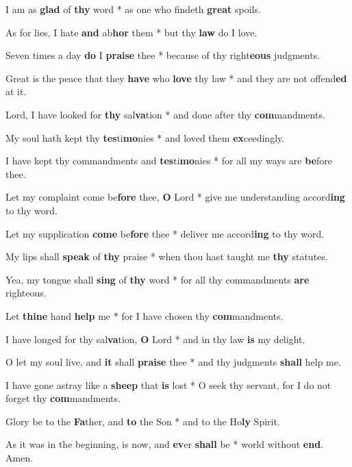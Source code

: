 \begin{multicols}{2}
	I am as \textbf{glad} of \textbf{thy} word * as one who findeth \textbf{great} spoils.
	
	As for lies, I hate \textbf{and} ab\textbf{hor} them * but thy \textbf{law} do I love.
	
	Seven times a day \textbf{do} I \textbf{praise} thee * because of thy right\textbf{eous} judgments.
	
	Great is the peace that they \textbf{have} who \textbf{love} thy law * and they are not offend\textbf{ed} at it.
	
	Lord, I have looked for \textbf{thy} sal\textbf{va}tion * and done after thy \textbf{com}mandments.
	
	My soul hath kept thy \textbf{tes}ti\textbf{mo}nies * and loved them \textbf{ex}ceedingly.
	
	I have kept thy commandments and \textbf{tes}ti\textbf{mo}nies * for all my ways are \textbf{be}fore thee.
	
	Let my complaint come be\textbf{fore} thee, \textbf{O} Lord * give me understanding accord\textbf{ing} to thy word.
	
	Let my supplication \textbf{come} be\textbf{fore} thee * deliver me accord\textbf{ing} to thy word.
	
	My lips shall \textbf{speak} of \textbf{thy} praise * when thou hast taught me \textbf{thy} statutes.
	
	Yea, my tongue shall \textbf{sing} of \textbf{thy} word * for all thy commandments \textbf{are} righteous.
	
	Let \textbf{thine} hand \textbf{help} me * for I have chosen thy \textbf{com}mandments.
	
	I have longed for thy sal\textbf{va}tion, \textbf{O} Lord * and in thy law \textbf{is} my delight.
	
	O let my soul live, and \textbf{it} shall \textbf{praise} thee * and thy judgments \textbf{shall} help me.
	
	I have gone astray like a \textbf{sheep} that \textbf{is} lost * O seek thy servant, for I do not forget thy \textbf{com}mandments.
	
	Glory be to the \textbf{Fa}ther, and \textbf{to} the Son * and to the Ho\textbf{ly} Spirit.
	
	As it was in the beginning, is now, and \textbf{ev}er \textbf{shall} be * world without \textbf{end}. Amen.
\end{multicols}